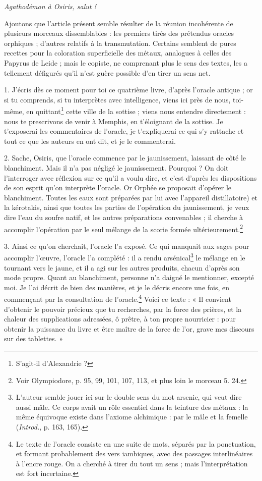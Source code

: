 \documentclass[a4paper, 11pt, oneside, polutonikogreek, french]{article}
\begin{document}
\emph{Agathodémon à Osiris, salut !}

Ajoutons que l'article présent semble résulter de la réunion incohérente de plusieurs morceaux dissemblables : les premiers tirés des prétendus oracles orphiques ; d'autres relatifs à la transmutation. Certains semblent de pures recettes pour la coloration superficielle des métaux, analogues à celles des Papyrus de Leide ; mais le copiste, ne comprenant plus le sens des textes, les a tellement défigurés qu'il n'est guère possible d'en tirer un sens net.

1. J'écris dès ce moment pour toi ce quatrième livre, d'après l'oracle antique ; or si tu comprends, si tu interprètes avec intelligence, viens ici près de nous, toi-même, en quittant\footnote{S'agit-il d'Alexandrie ?} cette ville de la sottise ; viens nous entendre directement : nous te prescrivons de venir à Memphis, en t'éloignant de la sottise. Je t'exposerai les commentaires de l'oracle, je t'expliquerai ce qui s'y rattache et tout ce que les auteurs en ont dit, et je le commenterai.

2. Sache, Osiris, que l'oracle commence par le jaunissement, laissant de côté le blanchiment. Mais il n'a pas négligé le jaunissement. Pourquoi ? On doit l'interroger avec réflexion sur ce qu'il a voulu dire, et c'est d'après les dispositions de son esprit qu'on interprète l'oracle. Or Orphée se proposait d'opérer le blanchiment. Toutes les eaux sont préparées par lui avec l'appareil distillatoire) et la kérotakis, ainsi que toutes les parties de l'opération du jaunissement, je veux dire l'eau du soufre natif, et les autres préparations convenables ; il cherche à accomplir l'opération par le seul mélange de la scorie formée ultérieurement.\footnote{Voir Olympiodore, p. 95, 99, 101, 107, 113, et plus loin le morceau 5. 24.}

3. Ainsi ce qu'on cherchait, l'oracle l'a exposé. Ce qui manquait aux sages pour accomplir l'œuvre, l'oracle l'a complété : il a rendu arsénical\footnote{L'auteur semble jouer ici sur le double sens du mot arsenic, qui veut dire aussi mâle. Ce corps avait un rôle essentiel dans la teinture des métaux : la même équivoque existe dans l'axiome alchimique : par le mâle et la femelle (\emph{Introd.}, p. 163, 165).} le mélange en le tournant vers le jaune, et il a agi sur les autres produits, chacun d'après son mode propre. Quant au blanchiment, personne n'a daigné le mentionner, excepté moi. Je l'ai décrit de bien des manières, et je le décris encore une fois, en commençant par la consultation de l'oracle.\footnote{Le texte de l'oracle consiste en une suite de mots, séparés par la ponctuation, et formant probablement des vers iambiques, avec des passages interlinéaires à l'encre rouge. On a cherché à tirer du tout un sens ; mais l'interprétation est fort incertaine.} Voici ce texte : « Il convient d'obtenir le pouvoir précieux que tu recherches, par la force des prières, et la chaleur des supplications adressées, ô prêtre, à ton propre nourricier : pour obtenir la puissance du livre et être maître de la force de l'or, grave mes discours sur des tablettes. »
\end{document}
